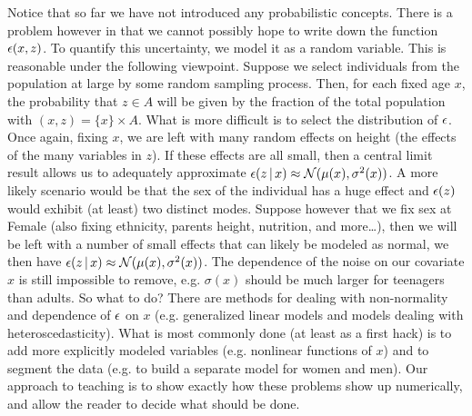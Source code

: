 Notice that so far we have not introduced any probabilistic concepts.  There is a problem however in that we cannot possibly hope to write down the function ${\epsilon}(x,z)$.  To quantify this uncertainty, we model it as a random variable.  This is reasonable under the following viewpoint.  Suppose we select individuals from the population at large by some random sampling process.  Then, for each fixed age $x$, the probability that $z \in A$ will be given by the fraction of the total population with $(x, z) = \{x\}\times A$.  What is more difficult is to select the distribution of ${\epsilon}$.  Once again, fixing $x$, we are left with many random effects on height (the effects of the many variables in $z$).  If these effects are all small, then a central limit result allows us to adequately approximate ${\epsilon}(z{\,|\,} x) \approx {\mathcal N}(\mu(x), \sigma^2(x))$.  A more likely scenario would be that the sex of the individual has a huge effect and ${\epsilon}(z)$ would exhibit (at least) two distinct modes.  Suppose however that we fix sex at Female (also fixing ethnicity, parents height, nutrition, and more\ldots), then we will be left with a number of small effects that can likely be modeled as normal, we then have ${\epsilon}(z{\,|\,} x) \approx{\mathcal N}(\mu(x), \sigma^2(x))$.  The dependence of the noise on our covariate $x$ is still impossible to remove, e.g. $\sigma(x)$ should be much larger for teenagers than adults.  
So what to do?  There are methods for dealing with non-normality and dependence of ${\epsilon}$ on $x$ (e.g. generalized linear models and models dealing with heteroscedasticity).  What is most commonly done (at least as a first hack) is to add more explicitly modeled variables (e.g. nonlinear functions of $x$) and to segment the data (e.g. to build a separate model for women and men).  Our approach to teaching is to show exactly how these problems show up numerically, and allow the reader to decide what should be done.

